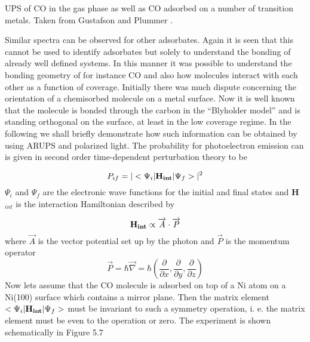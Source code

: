 \vspace*{11cm}

           UPS of CO in the gas phase as well as CO adsorbed on a number of transition metals. Taken from Gustafson and Plummer \cite{Gustafson}.

\vspace{1cm}



Similar spectra can be observed for other adsorbates. Again it is seen that this cannot be used to identify adsorbates but solely to understand the bonding of already well defined systems. In this manner it was possible to understand the bonding geometry of for instance CO and also how molecules interact with each other as a function of coverage. Initially there was much dispute concerning the orientation of a chemisorbed molecule on a metal surface. Now it is well known that the molecule is bonded through the carbon in the ``Blyholder  model''  and is standing orthogonal on the surface, at least in the low coverage regime. In the following we shall briefly demonstrate how such information can be obtained by using ARUPS and polarized light. The probability for photoelectron emission can is given in second order time-dependent perturbation theory to be 



\begin{equation}
P_{if}=|<\Psi_{i}|{\bf H_{int}}|\Psi_{f}>|^2
\end{equation}
$\Psi_i$ and $\Psi_f$ are the electronic wave functions for the initial and final states and   {\bf H$_{int}$} is the interaction Hamiltonian described by
 
\begin{equation}
 {\bf H_{int}} \propto  \overrightarrow{A} \cdot \overrightarrow{P}
\end{equation}
where $\overrightarrow{A}$ is the vector potential set up by the photon and $\overrightarrow{P}$ is the momentum operator 
\begin{equation}
 \overrightarrow{P} = \hbar  \overrightarrow{\nabla} = \hbar (\frac{\partial }{\partial x}, \frac{\partial }{\partial y}, \frac{\partial }{\partial z})
\end{equation}
Now lets assume that the CO molecule is adsorbed on top of a Ni atom on a Ni(100) surface which contains a mirror plane. Then the matrix element $<\Psi_i|{\bf H_{int}}|\Psi_f>$ must be invariant to such a symmetry operation, i. e. the matrix element must be even to the operation or zero. The experiment is shown schematically in Figure 5.7

